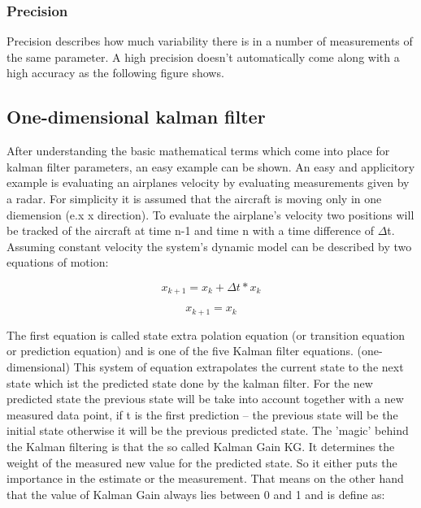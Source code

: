\subsubsection{Precision}
Precision describes how much variability there is in a number of measurements of the same parameter.
A high precision doesn't automatically come along with a high accuracy as the following figure shows.


\subsection{One-dimensional kalman filter}
After understanding the basic mathematical terms which come into place for kalman filter parameters, an easy example can be shown. An easy and applicitory example is evaluating an airplanes velocity by evaluating measurements given by a radar. For simplicity it is assumed that the aircraft is moving only in one diemension (e.x x direction). To evaluate the airplane's velocity two positions will be tracked of the aircraft at time n-1 and time n with a time difference of $\Delta$t. Assuming constant velocity the system's dynamic model can be described by two equations of motion:


\begin{equation}
x_{k+1} = x_k + \Delta{t} * x_k 
\end{equation}

\begin{equation}
x_{k+1} = x_k
\end{equation}


The first equation is called state extra polation equation (or transition equation or prediction equation) and is one of the five Kalman filter equations. (one-dimensional) This system of equation extrapolates the current state to the next state which ist the predicted state done by the kalman filter. For the new predicted state the previous state will be take into account together with a new measured data point, if t is the first prediction – the previous state will be the initial state otherwise it will be the previous predicted state.
The 'magic' behind the Kalman filtering is that the so called Kalman Gain KG. It determines the weight of the measured new value for the predicted state. So it either puts the importance in the estimate or the measurement. That means on the other hand that the value of Kalman Gain always lies between 0 and 1 and is define as:

